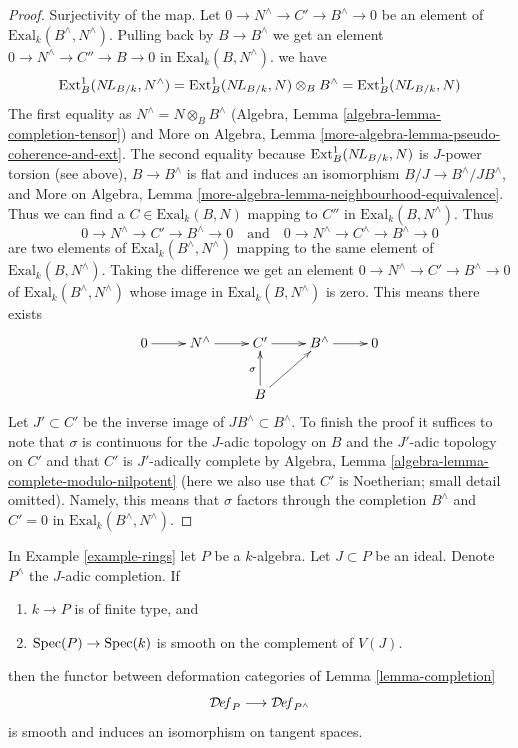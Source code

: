 \begin{proof}
\medskip\noindent
Surjectivity of the map. Let $0 \to N^\wedge \to C' \to B^\wedge \to 0$
be an element of $\text{Exal}_k(B^\wedge, N^\wedge)$.
Pulling back by $B \to B^\wedge$ we get an element
$0 \to N^\wedge \to C'' \to B \to 0$ in
$\text{Exal}_k(B, N^\wedge)$.
we have
$$
\text{Ext}^1_B(\mathop{N\!L}\nolimits_{B/k}, N^\wedge) =
\text{Ext}^1_B(\mathop{N\!L}\nolimits_{B/k}, N) \otimes_B B^\wedge =
\text{Ext}^1_B(\mathop{N\!L}\nolimits_{B/k}, N)
$$
The first equality as $N^\wedge = N \otimes_B B^\wedge$
(Algebra, Lemma \ref{algebra-lemma-completion-tensor})
and
More on Algebra, Lemma \ref{more-algebra-lemma-pseudo-coherence-and-ext}.
The second equality because $\text{Ext}^1_B(\mathop{N\!L}\nolimits_{B/k}, N)$
is $J$-power torsion (see above), $B \to B^\wedge$ is flat and induces
an isomorphism $B/J \to B^\wedge/JB^\wedge$, and
More on Algebra, Lemma \ref{more-algebra-lemma-neighbourhood-equivalence}.
Thus we can find a $C \in \text{Exal}_k(B, N)$ mapping to $C''$ in
$\text{Exal}_k(B, N^\wedge)$.
Thus
$$
0 \to N^\wedge \to C' \to B^\wedge \to 0
\quad\text{and}\quad
0 \to N^\wedge \to C^\wedge \to B^\wedge \to 0
$$
are two elements of $\text{Exal}_k(B^\wedge, N^\wedge)$
mapping to the same element of $\text{Exal}_k(B, N^\wedge)$.
Taking the difference we get an element
$0 \to N^\wedge \to C' \to B^\wedge \to 0$ of
$\text{Exal}_k(B^\wedge, N^\wedge)$
whose image in $\text{Exal}_k(B, N^\wedge)$ is zero.
This means there exists
$$
\xymatrix{
0 \ar[r] &
N^\wedge \ar[r] &
C' \ar[r] &
B^\wedge \ar[r] & 0 \\
& & B \ar[u]^\sigma \ar[ru]
}
$$
Let $J' \subset C'$ be the inverse image of $JB^\wedge \subset B^\wedge$.
To finish the proof it suffices to note that
$\sigma$ is continuous for the $J$-adic topology on $B$
and the $J'$-adic topology on $C'$ and that $C'$ is $J'$-adically complete by
Algebra, Lemma \ref{algebra-lemma-complete-modulo-nilpotent}
(here we also use that $C'$ is Noetherian; small detail omitted).
Namely, this means that $\sigma$ factors through the
completion $B^\wedge$ and $C' = 0$ in $\text{Exal}_k(B^\wedge, N^\wedge)$.
\end{proof}

\begin{lemma}
\label{lemma-smooth-completion}
In Example \ref{example-rings} let $P$ be a $k$-algebra.
Let $J \subset P$ be an ideal.
Denote $P^\wedge$ the $J$-adic completion. If
\begin{enumerate}
\item $k \to P$ is of finite type, and
\item $\mathop{\mathrm{Spec}}(P) \to \mathop{\mathrm{Spec}}(k)$ is smooth on the complement of $V(J)$.
\end{enumerate}
then the functor between deformation categories of
Lemma \ref{lemma-completion}
$$
\mathcal{D}\!\mathit{ef}_P \longrightarrow \mathcal{D}\!\mathit{ef}_{P^\wedge}
$$
is smooth and induces an isomorphism on tangent spaces.
\end{lemma}

